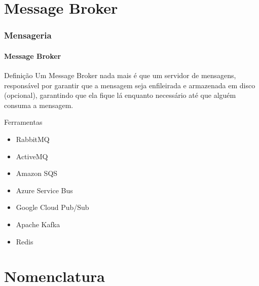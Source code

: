 \documentclass[
	9pt, %
	t, %
]{beamer}
\newcommand{\yellowbox}[1]{\colorbox{yellow!75}{#1}}
\begin{document}
\section{Message Broker}

\begin{frame}
	\frametitle{Mensageria}
	\framesubtitle{Message Broker}
	
	\begin{block}{Definição}
		Um Message Broker nada mais é que um \yellowbox{servidor de mensagens}, responsável por garantir que a mensagem seja enfileirada e armazenada em disco (opcional), garantindo que ela fique lá enquanto necessário até que alguém consuma a mensagem.
	\end{block}

	\begin{block}{Ferramentas}
		\begin{itemize}
			\item RabbitMQ
			\item ActiveMQ
			\item Amazon SQS
			\item Azure Service Bus
			\item Google Cloud Pub/Sub
			\item Apache Kafka
			\item Redis
		\end{itemize}
	\end{block}

\end{frame}

\section{Nomenclatura}
\end{document}
